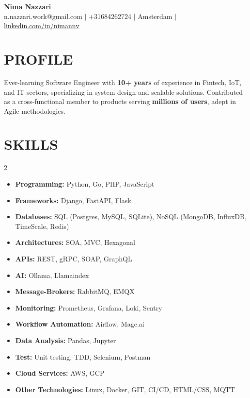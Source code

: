 \documentclass[11 pt,a4paper]{article} %
\newcommand{\namesize}{\LARGE}                %
\newcommand{\headerpositionsize}{\Large}      %
\newlength{\itemgap}
\begin{document}
\pagestyle{empty}

\begin{center}
    {\namesize \textbf{\textcolor{maintitlecolor}{Nima Nazzari}}} \quad {\headerpositionsize \textcolor{positioncolor}{Software Engineer}} \\ \vspace{0.4em} %
    n.nazzari.work@gmail.com $|$ +31684262724 $|$ \textcolor{companycolor}{Amsterdam} $|$ \href{https://linkedin.com/in/nimannv}{linkedin.com/in/nimannv} %
\end{center}

\section*{PROFILE}
Ever-learning Software Engineer with \textbf{10+ years} of experience in Fintech, IoT, and IT sectors, specializing in system design and scalable solutions. Contributed as a cross-functional member to products serving \textbf{millions of users}, adept in Agile methodologies. %

\section*{SKILLS}
\begin{multicols}{2}
\begin{itemize}[leftmargin=0.15in, label={}, itemsep=\itemgap, topsep=0pt]
    \item \textbf{Programming:} Python, Go, PHP, JavaScript %
    \item \textbf{Frameworks:} Django, FastAPI, Flask %
    \item \textbf{Databases:} SQL (Postgres, MySQL, SQLite), NoSQL (MongoDB, InfluxDB, TimeScale, Redis) %
    \item \textbf{Architectures:} SOA, MVC, Hexagonal %
    \item \textbf{APIs:} REST, gRPC, SOAP, GraphQL %
    \item \textbf{AI:} Ollama, Llamaindex %
    \item \textbf{Message-Brokers:} RabbitMQ, EMQX %
    \item \textbf{Monitoring:} Prometheus, Grafana, Loki, Sentry %
    \item \textbf{Workflow Automation:} Airflow, Mage.ai %
    \item \textbf{Data Analysis:} Pandas, Jupyter %
    \item \textbf{Test:} Unit testing, TDD, Selenium, Postman %
    \item \textbf{Cloud Services:} AWS, GCP %
    \item \textbf{Other Technologies:} Linux, Docker, GIT, CI/CD, HTML/CSS, MQTT %
\end{itemize}
\end{multicols}
\end{document}
